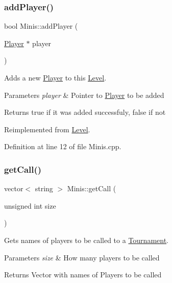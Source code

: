 \subsubsection{\texorpdfstring{add\+Player()}{addPlayer()}}
{\footnotesize\ttfamily bool Minis\+::add\+Player (\begin{DoxyParamCaption}\item[{\hyperlink{class_player}{Player} $\ast$}]{player }\end{DoxyParamCaption})\hspace{0.3cm}{\ttfamily [virtual]}}



Adds a new \hyperlink{class_player}{Player} to this \hyperlink{class_level}{Level}. 


\begin{DoxyParams}{Parameters}
{\em player} & Pointer to \hyperlink{class_player}{Player} to be added \\
\hline
\end{DoxyParams}
\begin{DoxyReturn}{Returns}
true if it was added successfuly, false if not 
\end{DoxyReturn}


Reimplemented from \hyperlink{class_level_a66290778fa4bcd2f29b9ff3e605b2902}{Level}.



Definition at line 12 of file Minis.\+cpp.

\hypertarget{class_minis_ad2c86c585b05e735bb6e38f672b9bbab}{}\label{class_minis_ad2c86c585b05e735bb6e38f672b9bbab} 
\subsubsection{\texorpdfstring{get\+Call()}{getCall()}}
{\footnotesize\ttfamily vector$<$ string $>$ Minis\+::get\+Call (\begin{DoxyParamCaption}\item[{unsigned int}]{size }\end{DoxyParamCaption})\hspace{0.3cm}{\ttfamily [virtual]}}



Gets names of players to be called to a \hyperlink{class_tournament}{Tournament}. 


\begin{DoxyParams}{Parameters}
{\em size} & How many players to be called \\
\hline
\end{DoxyParams}
\begin{DoxyReturn}{Returns}
Vector with names of Players to be called 
\end{DoxyReturn}


